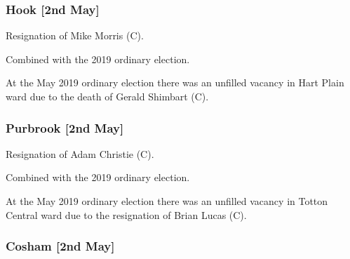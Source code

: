 \begin{resultsiii}

	\subsubsection*{Hook \hspace*{\fill}\nolinebreak[1]%
		\enspace\hspace*{\fill}
		[2nd May]}


	Resignation of Mike Morris (C).

	Combined with the 2019 ordinary election.


	At the May 2019 ordinary election there was an unfilled vacancy in Hart Plain ward due to the death of Gerald Shimbart (C).

	\subsubsection*{Purbrook \hspace*{\fill}\nolinebreak[1]%
		\enspace\hspace*{\fill}
		[2nd May]}


	Resignation of Adam Christie (C).

	Combined with the 2019 ordinary election.


	At the May 2019 ordinary election there was an unfilled vacancy in Totton Central ward due to the resignation of Brian Lucas (C).


	\subsubsection*{Cosham \hspace*{\fill}\nolinebreak[1]%
		\enspace\hspace*{\fill}
		[2nd May]}




\end{resultsiii}
